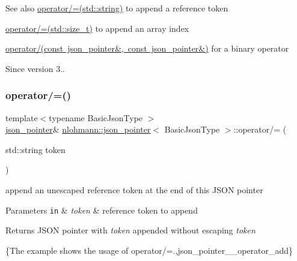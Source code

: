 \begin{DoxySeeAlso}{See also}
\mbox{\hyperlink{classnlohmann_1_1json__pointer_abdd21567b2b1d69329af0f520335e68b}{operator/=(std\+::string)}} to append a reference token 

\mbox{\hyperlink{classnlohmann_1_1json__pointer_a64c8401529131bad1e486d91d703795f}{operator/=(std\+::size\+\_\+t)}} to append an array index 

\mbox{\hyperlink{classnlohmann_1_1json__pointer_a90a11fe6c7f37b1746a3ff9cb24b0d53}{operator/(const json\+\_\+pointer\&, const json\+\_\+pointer\&)}} for a binary operator
\end{DoxySeeAlso}
\begin{DoxySince}{Since}
version 3.. 
\end{DoxySince}
\mbox{\label{classnlohmann_1_1json__pointer_abdd21567b2b1d69329af0f520335e68b}} 
\subsubsection{\texorpdfstring{operator/=()}{operator/=()}\hspace{0.1cm}{\footnotesize\ttfamily [2/3]}}
{\footnotesize\ttfamily template$<$typename Basic\+Json\+Type $>$ \\
\mbox{\hyperlink{classnlohmann_1_1json__pointer}{json\+\_\+pointer}}\& \mbox{\hyperlink{classnlohmann_1_1json__pointer}{nlohmann\+::json\+\_\+pointer}}$<$ Basic\+Json\+Type $>$\+::operator/= (\begin{DoxyParamCaption}\item[{std\+::string}]{token }\end{DoxyParamCaption})\hspace{0.3cm}{\ttfamily [inline]}}



append an unescaped reference token at the end of this J\+S\+ON pointer 


\begin{DoxyParams}[1]{Parameters}
\mbox{\tt in}  & {\em token} & reference token to append \\
\hline
\end{DoxyParams}
\begin{DoxyReturn}{Returns}
J\+S\+ON pointer with {\itshape token} appended without escaping {\itshape token} 
\end{DoxyReturn}
\{The example shows the usage of {\ttfamily operator/=}.,json\+\_\+pointer\+\_\+\+\_\+operator\+\_\+add\}

